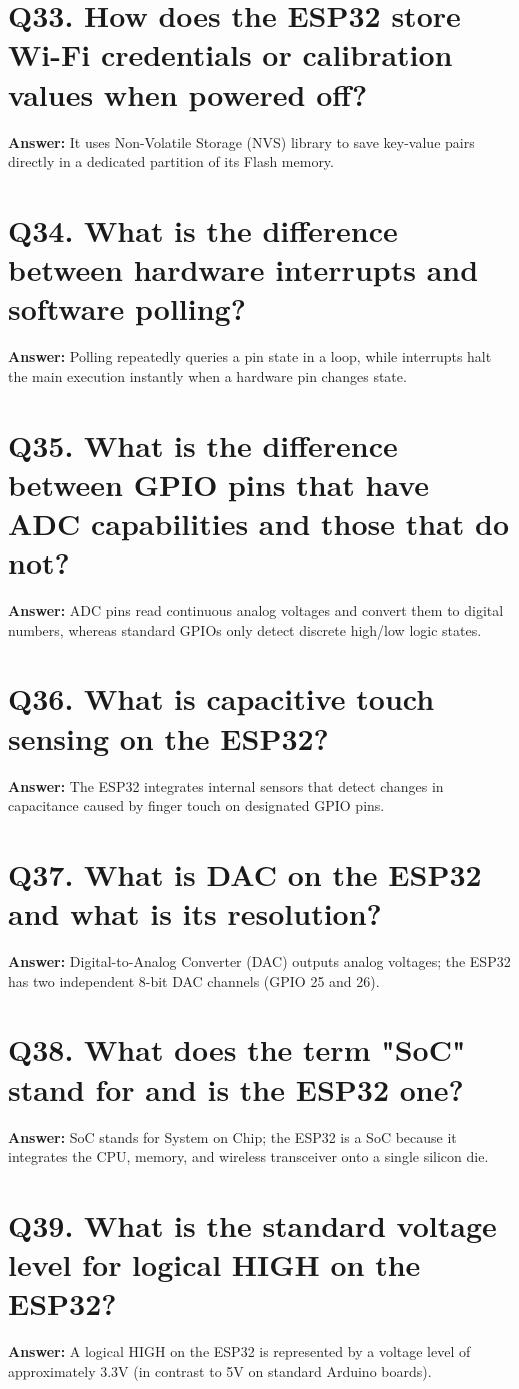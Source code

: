 \documentclass[12pt,a4paper,oneside]{report}
\begin{document}
\section{Q33. How does the ESP32 store Wi-Fi credentials or calibration values when powered off?}
\textbf{Answer:} It uses Non-Volatile Storage (NVS) library to save key-value pairs directly in a dedicated partition of its Flash memory.

\section{Q34. What is the difference between hardware interrupts and software polling?}
\textbf{Answer:} Polling repeatedly queries a pin state in a loop, while interrupts halt the main execution instantly when a hardware pin changes state.

\section{Q35. What is the difference between GPIO pins that have ADC capabilities and those that do not?}
\textbf{Answer:} ADC pins read continuous analog voltages and convert them to digital numbers, whereas standard GPIOs only detect discrete high/low logic states.

\section{Q36. What is capacitive touch sensing on the ESP32?}
\textbf{Answer:} The ESP32 integrates internal sensors that detect changes in capacitance caused by finger touch on designated GPIO pins.

\section{Q37. What is DAC on the ESP32 and what is its resolution?}
\textbf{Answer:} Digital-to-Analog Converter (DAC) outputs analog voltages; the ESP32 has two independent 8-bit DAC channels (GPIO 25 and 26).

\section{Q38. What does the term "SoC" stand for and is the ESP32 one?}
\textbf{Answer:} SoC stands for System on Chip; the ESP32 is a SoC because it integrates the CPU, memory, and wireless transceiver onto a single silicon die.

\section{Q39. What is the standard voltage level for logical HIGH on the ESP32?}
\textbf{Answer:} A logical HIGH on the ESP32 is represented by a voltage level of approximately 3.3V (in contrast to 5V on standard Arduino boards).
\end{document}

